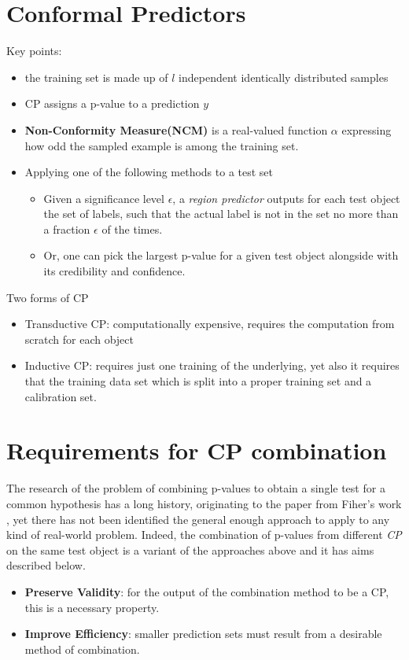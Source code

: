 \documentclass[10pt,a4paper]{article}
\begin{document}
\section{Conformal Predictors}
Key points:
\begin{itemize}
    \item the training set is made up of $l$ independent identically distributed samples
    \item CP assigns a p-value to a prediction $y$
    \item \textbf{Non-Conformity Measure(NCM)} is a real-valued function $\alpha$ expressing how odd the sampled example is among the training set.
    \item Applying one of the following methods to a test set
    \begin{itemize}
        \item Given a significance level $\epsilon$, a \textit{region predictor} outputs for each test object the set of labels, such that the actual label is not in the set no more than a fraction $\epsilon$ of the times.
        \item Or, one can pick the largest p-value for a given test object alongside with its credibility and confidence.
    \end{itemize}
\end{itemize}
Two forms of CP
\begin{itemize}
    \item Transductive CP: computationally expensive, requires the computation from scratch for each object
    \item Inductive CP: requires just one training of the underlying, yet also it requires that the training data set which is split into a proper training set and a calibration set.
\end{itemize}

\section{Requirements for CP combination}
The research of the problem of combining p-values to obtain a single test for a common hypothesis has a long history, originating to the paper from Fiher's work \cite{fisher1992statistical}, yet there has not been identified the general enough approach to apply to any kind of real-world problem. Indeed, the combination of p-values from different \textit{CP} on the same test object is a variant of the approaches above and it has aims described below.
\begin{itemize}
    \item \textbf{Preserve Validity}: for the output of the combination method to be a CP, this is a necessary property.
    \item \textbf{Improve Efficiency}: smaller prediction sets must result from a desirable method of combination.
\end{itemize}
\end{document}
